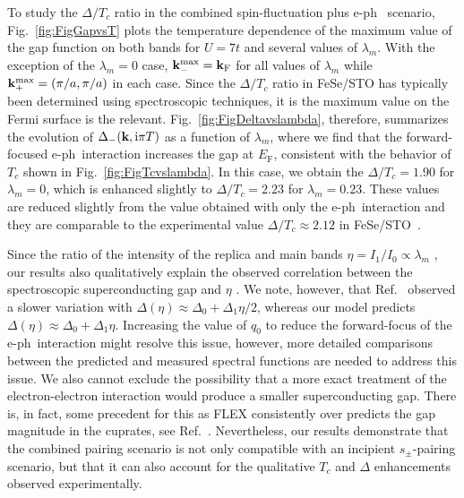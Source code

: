 \documentclass[%
 reprint,
 superscriptaddress,
nofootinbib,
nobibnotes,
 amsmath,amssymb,
 aps,
 prb,
 dvipsnames, 
 floatfix
]{revtex4-2}
\newcommand{\eph}{e-ph}
\begin{document}
To study the $\Delta/T_c$ ratio in the combined spin-fluctuation plus \eph~ scenario, Fig.~\ref{fig:FigGapvsT} plots the temperature dependence of the maximum value of the 
gap function on both bands for $U = 7t$ and several values of $\lambda_m$. With the exception of 
the $\lambda_m = 0$ case, ${\bf k}_-^\text{max} = {\bf k}_\mathrm{F}$ for all values of 
$\lambda_m$ while ${\bf k}_+^\text{max} = (\pi/a,\pi/a)$ in each case. 
Since the $\Delta/T_c$ ratio in FeSe/STO has typically been determined using spectroscopic techniques, it is the maximum value on the Fermi surface is the relevant. Fig.~\ref{fig:FigDeltavslambda}, 
therefore, summarizes the evolution of $\Delta_{-}({\bf k},\text{i}\pi T)$ as a function 
of $\lambda_m$, where we find that the forward-focused \eph~interaction increases the 
gap at $E_\text{F}$, consistent with the behavior of $T_c$ shown in Fig.~\ref{fig:FigTcvslambda}. 
In this case, we obtain the $\Delta / T_c = 1.90$ for $\lambda_m = 0$, which is enhanced 
slightly to $\Delta / T_c = 2.23$ for $\lambda_m = 0.23$. These values are reduced slightly from the value obtained with only the \eph~interaction and they are comparable to the experimental value $\Delta/T_c\approx 2.12$ in FeSe/STO~\cite{Song:2019cg,Lee2014}. 

Since the ratio of the intensity of the replica and main bands 
$\eta = I_1/I_0 \propto \lambda_m$ \cite{Rademaker2016}, our results also 
qualitatively explain the observed correlation between the spectroscopic 
superconducting gap and $\eta$ \cite{Song:2019cg}. We note, however, that Ref.~\cite{Song:2019cg} 
observed a slower variation with $\Delta(\eta) \approx \Delta_0 + \Delta_1 \eta/2$, whereas our model 
predicts $\Delta(\eta) \approx \Delta_0 + \Delta_1 \eta$. Increasing the value of 
$q_0$ to reduce the forward-focus of the \eph~interaction might resolve this issue, however, more 
detailed comparisons between the predicted and measured spectral functions are needed to address 
this issue. We also cannot exclude the possibility that a more exact treatment of the electron-electron interaction would produce a smaller superconducting gap. There is, in fact, some precedent for this as FLEX consistently over predicts the gap magnitude in the cuprates, see Ref.~\cite{Monthoux:1994jn}. 
Nevertheless, our results demonstrate that the combined pairing scenario is not only compatible 
with an incipient $s_\pm$-pairing scenario, but that it can also account for the qualitative $T_c$ and 
$\Delta$ enhancements observed experimentally. 
\end{document}
